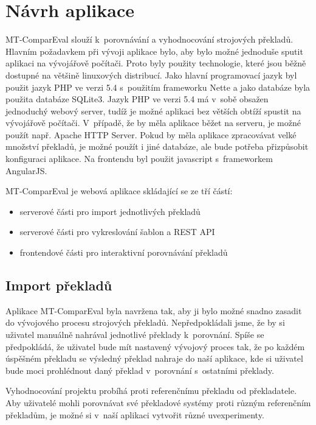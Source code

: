 \chapter{Návrh aplikace}
\mbox{MT-ComparEval} slouží k~porovnávání a vyhodnocování strojových překladů.
Hlavním požadavkem při vývoji aplikace bylo,
  aby bylo možné jednoduše sputit aplikaci na vývojářově počítači.
Proto byly použity technologie,
  které jsou běžně dostupné na většině linuxových distribucí.
Jako hlavní programovací jazyk byl použit jazyk PHP ve verzi 5.4 
  s~použitím frameworku Nette
  a jako databáze byla použita databáze SQLite3.
Jazyk PHP ve verzi 5.4 má v~sobě obsažen jednoduchý webový server,
  tudíž je možné aplikaci bez větších obtíží spustit na vývojářově počítači.
V~případě, že by měla aplikace běžet na serveru,
  je možné použít např. Apache HTTP Server.
Pokud by měla aplikace zpracovávat velké množství překladů,
  je možné použít i jiné databáze,
  ale bude potřeba přizpůsobit konfiguraci aplikace.
Na frontendu byl použit javascript s~frameworkem AngularJS.


\mbox{MT-ComparEval} je webová aplikace skládající se ze tří částí:

\begin{itemize}
	\item serverové části pro import jednotlivých překladů
	\item serverové části pro vykreslování šablon a REST API
	\item frontendové části pro interaktivní porovnávání překladů
\end{itemize}

\section{Import překladů}
Aplikace \mbox{MT-ComparEval} byla navržena tak,
  aby ji bylo možné snadno zasadit do vývojového procesu strojových překladů.
Nepředpokládali jsme,
  že by si uživatel manuálně nahrával jednotlivé překlady k~porovnání.
Spíše se předpokládá, že uživatel bude mít nastavený vývojový proces tak,
  že po každém úspěšném překladu se výsledný překlad nahraje do naší aplikace,
  kde si uživatel bude moci prohlédnout daný překlad v~porovnání s~ostatními překlady.

Vyhodnocování projektu probíhá proti referenčnímu překladu od překladatele.
Aby uživatelé mohli porovnávat své překladové systémy proti různým referenčním překladům,
  je možné si v~naší aplikaci vytvořit různé uv{experimenty}. 

